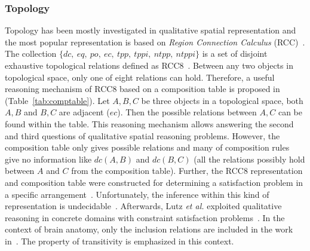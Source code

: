 \documentclass{article}
\begin{document}
\subsubsection{Topology}
Topology has been mostly investigated in qualitative spatial representation and the most popular representation is based on \textit{Region Connection Calculus} (RCC)~\cite{cohn1997qualitative}.
The collection $\{dc,~eq,~po,~ec,~tpp,~tppi,~ntpp,~ntppi\}$ is a set of disjoint exhaustive topological relations defined as RCC8~\cite{randell1992spatial}.
Between any two objects in topological space, only one of eight relations can hold.
Therefore, a useful reasoning mechanism of RCC8 based on a composition table is proposed in~\cite{egenhofer1991reasoning} (Table~\ref{tab:comptable}).
Let $A,B,C$ be three objects in a topological space, both $A,B$ and $B,C$ are adjacent ($ec$). Then the possible relations between $A,C$ can be found within the table.
This reasoning mechanism allows answering the second and third questions of qualitative spatial reasoning problems. 
However, the composition table only gives possible relations and many of composition rules give no information like $dc(A,B)$ and $dc(B,C)$ (all the relations possibly
hold between $A$ and $C$ from the composition table).
Further, the RCC8 representation and composition table were constructed for determining a satisfaction problem 
in a specific arrangement~\cite{wessel2000obstacle,wessel00alcra}.
Unfortunately, the inference within this kind of representation is undecidable~\cite{wessel2000obstacle}. 
Afterwards, Lutz \textit{et al.} exploited qualitative reasoning in concrete domains with constraint satisfaction problems~\cite{lutz2007tableau}.
In the context of brain anatomy, only the inclusion relations are included in the work in~\cite{santos2012region}.
The property of transitivity  is emphasized in this context. 
\end{document}
